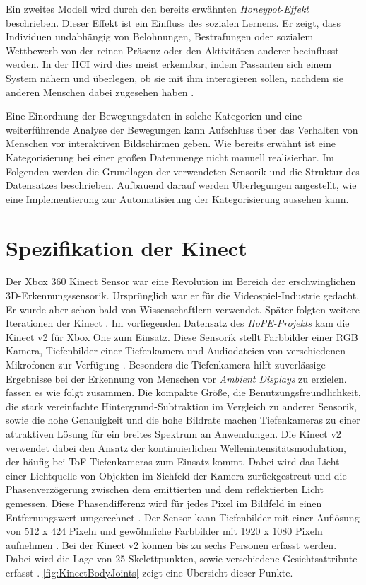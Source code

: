 Ein zweites Modell wird durch den bereits erwähnten \emph{Honeypot-Effekt} beschrieben.
Dieser Effekt ist ein Einfluss des sozialen Lernens.
Er zeigt, dass Individuen undabhängig von Belohnungen, Bestrafungen oder sozialem Wettbewerb
von der reinen Präsenz oder den Aktivitäten anderer beeinflusst werden.
In der \ac{HCI} wird dies meist erkennbar, indem Passanten sich einem System nähern
und überlegen, ob sie mit ihm interagieren sollen,
nachdem sie anderen Menschen dabei zugesehen haben \citep{wouters_uncovering_2016}.

Eine Einordnung der Bewegungsdaten in solche Kategorien
und eine weiterführende Analyse der Bewegungen kann Aufschluss über das Verhalten von Menschen
vor interaktiven Bildschirmen geben.
Wie bereits erwähnt ist eine Kategorisierung bei einer großen Datenmenge nicht manuell realisierbar.
Im Folgenden werden die Grundlagen der verwendeten Sensorik
und die Struktur des Datensatzes beschrieben.
Aufbauend darauf werden Überlegungen angestellt,
wie eine Implementierung zur Automatisierung der Kategorisierung aussehen kann.


\section{Spezifikation der Kinect}
\label{chapter1-SpezifikationKinect}
Der Xbox 360 Kinect Sensor war eine Revolution im Bereich der erschwinglichen 3D-Erkennungssensorik.
Ursprünglich war er für die Videospiel-Industrie gedacht.
Er wurde aber schon bald von Wissenschaftlern verwendet.
Später folgten weitere Iterationen der Kinect \citep{tolgyessy_evaluation_2021}.
Im vorliegenden Datensatz des \emph{HoPE-Projekts} kam die Kinect v2 für Xbox One zum Einsatz.
Diese Sensorik stellt Farbbilder einer \ac{RGB} Kamera, Tiefenbilder einer Tiefenkamera
und Audiodateien von verschiedenen Mikrofonen zur Verfügung \citep{windows-developer-center_microsoft_corporation_human_2014}.
Besonders die Tiefenkamera hilft zuverlässige Ergebnisse bei der Erkennung von Menschen vor \emph{Ambient Displays} zu erzielen.
\citet{li_time-flight_2014} fassen es wie folgt zusammen.
Die kompakte Größe, die Benutzungsfreundlichkeit,
die stark vereinfachte Hintergrund-Subtraktion im Vergleich zu anderer Sensorik, sowie die hohe Genauigkeit
und die hohe Bildrate machen Tiefenkameras zu einer attraktiven Lösung für ein breites Spektrum an Anwendungen.
Die Kinect v2 verwendet dabei den Ansatz der kontinuierlichen Wellenintensitätsmodulation,
der häufig bei \ac{ToF}-Tiefenkameras zum Einsatz kommt.
Dabei wird das Licht einer Lichtquelle von Objekten im Sichfeld der Kamera zurückgestreut
und die Phasenverzögerung zwischen dem emittierten und dem reflektierten Licht gemessen.
Diese Phasendifferenz wird für jedes Pixel im Bildfeld in einen Entfernungswert umgerechnet \citep{tolgyessy_evaluation_2021}.
Der Sensor kann Tiefenbilder mit einer Auflösung von 512 x 424 Pixeln
und gewöhnliche Farbbilder mit 1920 x 1080 Pixeln aufnehmen \citep{marin_multi-camera_2019}.
Bei der Kinect v2 können bis zu sechs Personen erfasst werden.
Dabei wird die Lage von 25 Skelettpunkten, sowie verschiedene Gesichtsattribute erfasst \citep{windows-developer-center_microsoft_corporation_human_2014}.
\autoref{fig:KinectBodyJoints} zeigt eine Übersicht dieser Punkte. 

